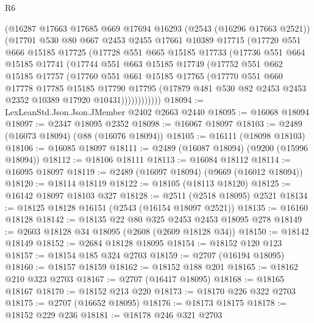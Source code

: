 \begin{lexlean}{R6}
\begin{coremodule}
        (@16287
          @17663
          @17685
          @669
          @17694
          @16293
          (@2543 (@16296 @17663 @2521))
          (@17701
            @530
            @80
            @667
            @2453
            @2455
            @17661
            @10389
            @17715
            (@17720
              @551
              @666
              @15185
              @17725
              (@17728
                @551
                @665
                @15185
                @17733
                (@17736
                  @551
                  @664
                  @15185
                  @17741
                  (@17744
                    @551
                    @663
                    @15185
                    @17749
                    (@17752
                      @551
                      @662
                      @15185
                      @17757
                      (@17760
                        @551
                        @661
                        @15185
                        @17765
                        (@17770
                          @551
                          @660
                          @17778
                          @17785
                          @15185
                          @17790
                          @17795
                          (@17879 @481 @530 @82 @2453 @2453 @2352 @10389 @17920 @10431))))))))))))
@18094 := LexLeanStd.Json.Json.JMember @2402 @2663 @2440
@18095 := @16068 @18094
@18097 := @2347 @18095 @2352
@18098 := @16067 @18097
@18103 := @2489 (@16073 @18094) (@88 (@16076 @18094))
@18105 := @16111 (@18098 @18103)
@18106 := @16085 @18097
@18111 := @2489 (@16087 @18094) (@9200 (@15996 @18094))
@18112 := @18106 @18111
@18113 := @16084 @18112
@18114 := @16095 @18097
@18119 := @2489 (@16097 @18094) (@9669 (@16012 @18094))
@18120 := @18114 @18119
@18122 := @18105 (@18113 @18120)
@18125 := @16142 @18097 @18103 @327
@18128 := @2511 (@2518 @18095) @2521
@18134 := @18125 @18128 @16151 (@2543 (@16154 @18097 @2521))
@18135 := @16160 @18128
@18142 := @18135 @22 @80 @325 @2453 @2453 @18095 @278
@18149 := @2603 @18128 @34 @18095 (@2608 (@2609 @18128 @34))
@18150 := @18142 @18149
@18152 := @2684 @18128 @18095
@18154 := @18152 @120 @123
@18157 := @18154 @185 @324 @2703
@18159 := @2707 (@16194 @18095)
@18160 := @18157 @18159
@18162 := @18152 @188 @201
@18165 := @18162 @210 @323 @2703
@18167 := @2707 (@16417 @18095)
@18168 := @18165 @18167
@18170 := @18152 @213 @220
@18173 := @18170 @226 @322 @2703
@18175 := @2707 (@16652 @18095)
@18176 := @18173 @18175
@18178 := @18152 @229 @236
@18181 := @18178 @246 @321 @2703

\end{coremodule}
\end{lexlean}
